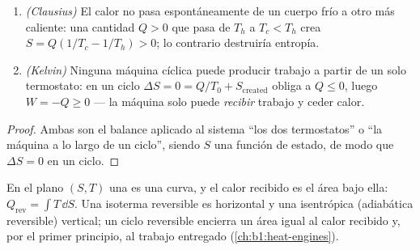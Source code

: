 \begin{proposition}\label{prop:b1:second-law-entropy:clausiuskelvin}
\begin{enumerate}
  \item \emph{(Clausius)} El calor no pasa espontáneamente de un cuerpo
        frío a otro más caliente: una cantidad $Q > 0$ que pasa de $T_h$ a
        $T_c < T_h$ crea $S = Q(1/T_c - 1/T_h) > 0$; lo contrario
        destruiría entropía.
  \item \emph{(Kelvin)} Ninguna máquina cíclica puede producir trabajo a
        partir de un solo termostato: en un ciclo $\Delta S = 0 = Q/T_0 + S_{\mathrm{created}}$
        obliga a $Q \leq 0$, luego $W = -Q \geq 0$ --- la máquina solo puede
        \emph{recibir} trabajo y ceder calor.
\end{enumerate}
\end{proposition}

\begin{proof}
Ambas son el balance aplicado al sistema ``los dos termostatos'' o ``la
máquina a lo largo de un ciclo'', siendo $S$ una función de estado, de
modo que $\Delta S
= 0$ en un ciclo.
\end{proof}

\begin{definition}\label{def:b1:second-law-entropy:TS}
En el plano $(S, T)$ una  es una curva, y el
calor recibido es el área bajo ella: $Q_{\mathrm{rev}} = \int T\,\dd S$. Una
isoterma reversible es horizontal y una isentrópica (adiabática
reversible) vertical; un ciclo reversible encierra un área igual al calor
recibido y, por el primer principio, al trabajo entregado
(\cref{ch:b1:heat-engines}).
\end{definition}


